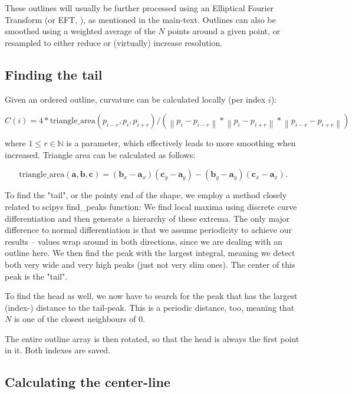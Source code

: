 \documentclass[9pt,lineno]{elife}
\newcommand{\norm}[1]{\left\lVert#1\right\rVert}
\begin{document}
\begin{appendixbox}
These outlines will usually be further processed using an Elliptical Fourier Transform (or EFT, \cite{kuhl1982elliptic}), as mentioned in the main-text. Outlines can also be smoothed using a weighted average of the $N$ points around a given point, or resampled to either reduce or (virtually) increase resolution.

\subsection{Finding the tail}

Given an ordered outline, curvature can be calculated locally (per index $i$):

$$ C(i) = 4 * \mathrm{triangle\_area}\left(p_{i-r}, p_{i}, p_{i+r}\right) / \left( \norm{p_{i} - p_{i-r}} * \norm{p_{i} - p_{i+r}} * \norm{p_{i-r} - p_{i+r}} \right) $$

where $1 \leq r\in \mathbb{N}$ is a parameter, which effectively leads to more smoothing when increased. Triangle area can be calculated as follows:

$$ \mathrm{triangle\_area}\left(\mathbf{a},\mathbf{b},\mathbf{c}\right) = (\mathbf{b}_x - \mathbf{a}_x) (\mathbf{c}_y - \mathbf{a}_y) - (\mathbf{b}_y - \mathbf{a}_y) (\mathbf{c}_x - \mathbf{a}_x). $$

To find the "tail", or the pointy end of the shape, we employ a method closely related to scipys find\_peaks function: We find local maxima using discrete curve differentiation and then generate a hierarchy of these extrema. The only major difference to normal differentiation is that we assume periodicity to achieve our results -- values wrap around in both directions, since we are dealing with an outline here. We then find the peak with the largest integral, meaning we detect both very wide and very high peaks (just not very slim ones). The center of this peak is the "tail".

To find the head as well, we now have to search for the peak that has the largest (index-) distance to the tail-peak. This is a periodic distance, too, meaning that $N$ is one of the closest neighbours of $0$.

The entire outline array is then rotated, so that the head is always the first point in it. Both indexes are saved.

\subsection{Calculating the center-line}


\end{appendixbox}
\end{document}
